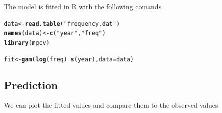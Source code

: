 \documentclass{article}\usepackage[]{graphicx}\usepackage[]{color}
\makeatletter
\newcommand{\hlstr}[1]{\textcolor[rgb]{0.192,0.494,0.8}{#1}}%
\newcommand{\hlopt}[1]{\textcolor[rgb]{0,0,0}{#1}}%
\newcommand{\hlstd}[1]{\textcolor[rgb]{0.345,0.345,0.345}{#1}}%
\newcommand{\hlkwb}[1]{\textcolor[rgb]{0.69,0.353,0.396}{#1}}%
\newcommand{\hlkwc}[1]{\textcolor[rgb]{0.333,0.667,0.333}{#1}}%
\newcommand{\hlkwd}[1]{\textcolor[rgb]{0.737,0.353,0.396}{\textbf{#1}}}%
\newenvironment{kframe}{%
 \def\at@end@of@kframe{}%
 \ifinner\ifhmode%
  \def\at@end@of@kframe{\end{minipage}}%
  \begin{minipage}{\columnwidth}%
 \fi\fi%
 \def\FrameCommand##1{\hskip\@totalleftmargin \hskip-\fboxsep
 \colorbox{shadecolor}{##1}\hskip-\fboxsep
     \hskip-\linewidth \hskip-\@totalleftmargin \hskip\columnwidth}%
 \MakeFramed {\advance\hsize-\width
   \@totalleftmargin\z@ \linewidth\hsize
   \@setminipage}}%
 {\par\unskip\endMakeFramed%
 \at@end@of@kframe}
\newenvironment{knitrout}{}{} %
\makeatother
\begin{document}
The model is fitted in R with the following comands

\begin{knitrout}
\color{fgcolor}\begin{kframe}
\begin{alltt}
\hlstd{data} \hlkwb{<-} \hlkwd{read.table}\hlstd{(}\hlstr{"frequency.dat"}\hlstd{)}
\hlkwd{names}\hlstd{(data)} \hlkwb{<-} \hlkwd{c}\hlstd{(}\hlstr{"year"}\hlstd{,} \hlstr{"freq"}\hlstd{)}
\hlkwd{library}\hlstd{(mgcv)}
\end{alltt}


{\ttfamily\noindent\itshape\color{messagecolor}{\#\# Loading required package: nlme}}

{\ttfamily\noindent\itshape{}}\begin{alltt}
\hlstd{fit} \hlkwb{<-} \hlkwd{gam}\hlstd{(}\hlkwd{log}\hlstd{(freq)} \hlopt{~} \hlkwd{s}\hlstd{(year),} \hlkwc{data} \hlstd{= data)}
\end{alltt}
\end{kframe}
\end{knitrout}

\subsection{Prediction}

We can plot the fitted values and compare them to the observed values
\end{document}
